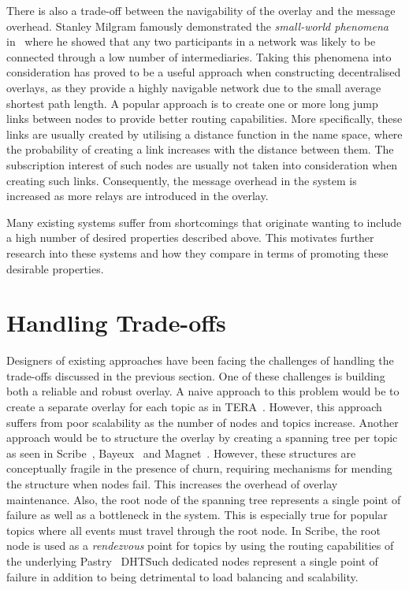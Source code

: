 There is also a trade-off between the navigability of the overlay and
the message overhead. Stanley Milgram famously demonstrated the
\emph{small-world phenomena} in~\cite{milgram1967small} where he showed
that any two participants in a network was likely to be connected
through a low number of intermediaries. Taking this phenomena into
consideration has proved to be a useful approach when constructing
decentralised overlays, as they provide a highly navigable network due
to the small average shortest path length. A popular approach is to
create one or more long jump links between nodes to provide better
routing capabilities. More specifically, these links are usually created
by utilising a distance function in the name space, where the
probability of creating a link increases with the distance between them.
The subscription interest of such nodes are usually not taken into
consideration when creating such links. Consequently, the message
overhead in the system is increased as more relays are introduced in the
overlay.

Many existing systems suffer from shortcomings that originate wanting
to include a high number of desired properties described above. This
motivates further research into these systems and how they compare in
terms of promoting these desirable properties.

\section{Handling Trade-offs}

Designers of existing approaches have been facing the challenges of
handling the trade-offs discussed in the previous section. One of these
challenges is building both a reliable and robust overlay. A naive
approach to this problem would be to create a separate overlay for each
topic as in TERA~\cite{Baldoni:2007}. However, this approach suffers from
poor scalability as the number of nodes and topics increase. Another
approach would be to structure the overlay by creating a spanning tree
per topic as seen in Scribe~\cite{Castro:2002}, Bayeux~\cite{Zhuang:2001}
and Magnet~\cite{Girdzijauskas:2010}. However, these structures are
conceptually fragile in the presence of churn, requiring mechanisms for
mending the structure when nodes fail. This increases the overhead of overlay
maintenance.  Also, the root node of the spanning tree represents a
single point of failure as well as a bottleneck in the system. This is
especially true for popular topics where all events must travel through
the root node. In Scribe, the root node is used as a \emph{rendezvous}
point for topics by using the routing capabilities of the underlying
Pastry~\cite{Rowstron:2001} DHT\. Such dedicated nodes represent a
single point of failure in addition to being detrimental to load
balancing and scalability.

